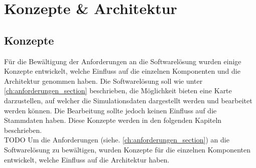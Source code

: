 \chapter{Konzepte \& Architektur}
\label{ch:konzepte_architektur}
\section{Konzepte}
Für die Bewältigung der Anforderungen an die Softwarelösung wurden einige Konzepte entwickelt, welche Einfluss auf die einzelnen Komponenten und die Architektur genommen haben. Die Softwarelösung soll wie unter \ref{ch:anforderungen_section}  beschrieben, die Möglichkeit bieten eine Karte darzustellen, auf welcher die Simulationsdaten dargestellt werden und bearbeitet werden können. Die Bearbeitung sollte jedoch keinen Einfluss auf die Stammdaten haben. Diese Konzepte werden in den folgenden Kapiteln beschrieben.\\
TODO
Um die Anforderungen (siehe. \ref{ch:anforderungen_section}) an die Softwarelösung zu bewältigen, wurden Konzepte für die einzelnen Komponenten entwickelt, welche Einfluss auf die Architektur haben.
